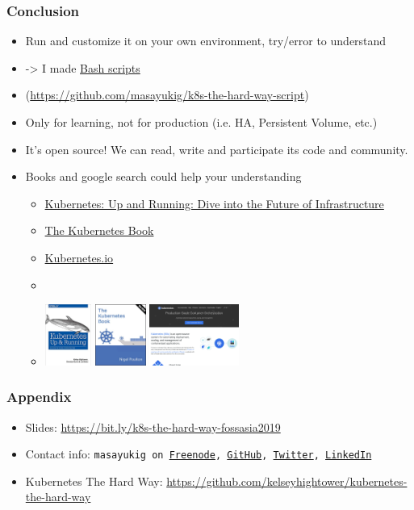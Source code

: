 \documentclass[aspectratio=169,11pt,hyperref={colorlinks=true}]{beamer}
\begin{document}
\begin{frame}
  \frametitle{Conclusion}
  \begin{itemize}
    \item Run and customize it on your own environment, try/error to understand
    \item[] -> I made \href{https://github.com/masayukig/k8s-the-hard-way-script}{Bash scripts}
    \item[] (\url{https://github.com/masayukig/k8s-the-hard-way-script})
    \item Only for learning, not for production (i.e. HA, Persistent Volume, etc.)
    \item It's open source! We can read, write and participate its code and community.
    \item Books and google search could help your understanding
    \begin{itemize}
      \item \href{https://www.amazon.com/dp/B075G373MJ/}{Kubernetes: Up and Running: Dive into the Future of Infrastructure}
      \item
      \href{https://www.amazon.com/dp/B072TS9ZQZ/}{The Kubernetes Book}
      \item
      \href{https://kubernetes.io}{Kubernetes.io}
      \item[]
      \item[] \includegraphics[height=20mm]{images/kubernetes-up-and-running.png}
       \includegraphics[height=20mm]{images/the-kubernetes-book.png}
       \includegraphics[height=20mm]{images/kubernetes-io.png}
    \end{itemize}
  \end{itemize}
\end{frame}

\begin{frame}
  \frametitle{Appendix}
  \begin{itemize}
      \item Slides: \url{https://bit.ly/k8s-the-hard-way-fossasia2019}
      \item Contact info: \texttt{masayukig on
        \href{https://freenode.net/}{Freenode},
        \href{https://github.com/masayukig}{GitHub},
        \href{https://twitter.com/masayukig}{Twitter},
        \href{https://www.linkedin.com/in/masayukig/}{LinkedIn}}
      \item Kubernetes The Hard Way: \url{https://github.com/kelseyhightower/kubernetes-the-hard-way}
  \end{itemize}
\end{frame}
\end{document}
